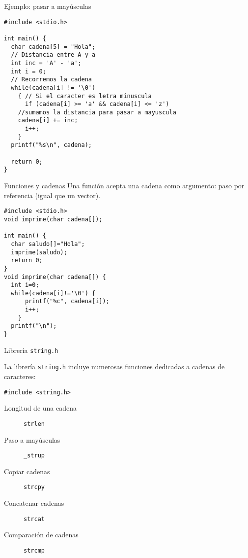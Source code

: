\documentclass[xcolor={usenames,svgnames,dvipsnames}, aspectratio=169]{beamer}
\begin{document}
\begin{frame}[label={sec:orge1a37f5},fragile,plain]{Ejemplo: pasar a mayúsculas}
 \lstset{language=C,label= ,caption= ,captionpos=b,numbers=none}
\begin{lstlisting}
#include <stdio.h>

int main() {
  char cadena[5] = "Hola";
  // Distancia entre A y a
  int inc = 'A' - 'a';
  int i = 0;
  // Recorremos la cadena
  while(cadena[i] != '\0')
    { // Si el caracter es letra minuscula
      if (cadena[i] >= 'a' && cadena[i] <= 'z')
	//sumamos la distancia para pasar a mayuscula
	cadena[i] += inc;
      i++;
    }
  printf("%s\n", cadena);

  return 0;
}
\end{lstlisting}
\end{frame}
\begin{frame}[label={sec:orgbfcc651},fragile]{Funciones y cadenas}
 Una función acepta una cadena como argumento: \alert{paso por referencia} (igual que un vector).

\lstset{language=C,label= ,caption= ,captionpos=b,numbers=none}
\begin{lstlisting}
#include <stdio.h>
void imprime(char cadena[]); 

int main() {
  char saludo[]="Hola";
  imprime(saludo);
  return 0;
}
void imprime(char cadena[]) {
  int i=0;
  while(cadena[i]!='\0') {
      printf("%c", cadena[i]);
      i++;
    }
  printf("\n");
}
\end{lstlisting}
\end{frame}
\begin{frame}[label={sec:org6401f99},fragile]{Librería \texttt{string.h}}
 \begin{block}{}
La librería \texttt{string.h} incluye numerosas funciones dedicadas a cadenas de caracteres:

\lstset{language=C,label= ,caption= ,captionpos=b,numbers=none}
\begin{lstlisting}
#include <string.h>
\end{lstlisting}

\begin{description}
\item[{Longitud de una cadena}] \texttt{strlen}
\item[{Paso a mayúsculas}] \texttt{\_strup}
\item[{Copiar cadenas}] \texttt{strcpy}
\item[{Concatenar cadenas}] \texttt{strcat}
\item[{Comparación de cadenas}] \texttt{strcmp}
\end{description}
\end{block}
\end{frame}
\end{document}
